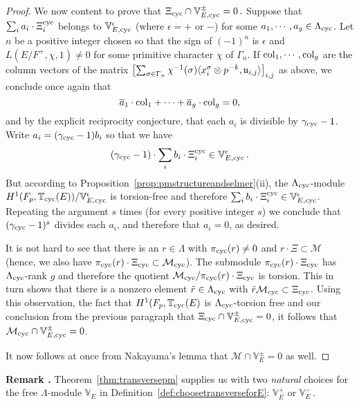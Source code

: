 \documentclass[12pt]{amsart}
\numberwithin{equation}{section}
\newenvironment{rem}{\par\medskip\noindent\refstepcounter{thm}
\bgroup{\hspace*{-0.15 cm}\bf{Remark} \thethm.}\bgroup}{\egroup
\egroup\par\medskip} \parskip 2pt
\begin{document}
\begin{proof}
We now content to prove that $\Xi_{\textup{cyc}} \cap \mathbb{V}^\pm_{E,{\textup{cyc}}}=0\,. $ Suppose that $\sum_i a_i\cdot \Xi_i^{\textup{cyc}}$ belongs to $\mathbb{V}^\epsilon_{E,{\textup{cyc}}}$ (where $\epsilon=+$ or $-$) for some $a_1,\cdots,a_g \in {\Lambda}_{\textup{cyc}}$. Let $n$ be a positive integer chosen so that the sign of $(-1)^n$ is $\epsilon$ and $L(E/F^+,\chi,1)\neq 0$ for some primitive character $\chi$ of $\Gamma_n$. If $\textup{col}_1,\cdots,\textup{col}_g$ are the column vectors of the matrix $\left[\sum_{\sigma\in \Gamma_n}\chi^{-1}(\sigma)\langle x_i^\sigma\otimes p^{-k},\frak{u}_{i,j}\rangle\right]_{i,j}$ as above, we conclude once again that 
$$\overline{a}_1\cdot\textup{col}_1+\cdots + \overline{a}_g\cdot\textup{col}_g=0,$$
and by the explicit reciprocity conjecture, that each $a_i$ is divisible by $\gamma_{\textup{cyc}}-1$. Write $a_i=(\gamma_{\textup{cyc}}-1)b_i$ so that we have 
$$(\gamma_{\textup{cyc}}-1)\cdot\sum_{i} b_i\cdot\Xi_i^{\textup{cyc}} \in \mathbb{V}^\epsilon_{E,{\textup{cyc}}}\,.$$ But according to Proposition~\ref{prop:pmstructureandselmer}(ii), the ${\Lambda}_{\textup{cyc}}$-module $ H^1(F_p,{\mathbb{T}}_{\textup{cyc}}(E))/\mathbb{V}^\epsilon_{E,{\textup{cyc}}}$ is torsion-free and therefore $\sum_{i} b_i\cdot\Xi_i^{\textup{cyc}} \in \mathbb{V}^\epsilon_{E,{\textup{cyc}}}$. Repeating the argument $s$ times (for every positive integer $s$) we conclude that $(\gamma_{\textup{cyc}}-1)^s$ divides each $a_i$, and therefore that $a_i=0$, as desired.

It is not hard to see that there is an $r \in {\Lambda}$ with $\pi_{\textup{cyc}}(r)\neq0$ and $r\cdot\Xi\subset \mathcal{M}$ (hence, we also have $\pi_{\textup{cyc}}(r)\cdot\Xi_{\textup{cyc}}\subset \mathcal{M}_{\textup{cyc}}$). 
The submodule $\pi_{\textup{cyc}}(r)\cdot\Xi_{\textup{cyc}}$ has ${\Lambda}_{\textup{cyc}}$-rank $g$ and therefore the quotient $\mathcal{M}_{\textup{cyc}}/\pi_{\textup{cyc}}(r)\cdot\Xi_{\textup{cyc}}$ is torsion. This in turn shows that there is a nonzero element $\tilde{r}\in {\Lambda}_{\textup{cyc}}$ with $\tilde{r}\mathcal{M}_{\textup{cyc}}\subset \Xi_{\textup{cyc}}$. Using this observation, the fact that $ H^1(F_p,{\mathbb{T}}_{\textup{cyc}}(E)$ is ${\Lambda}_{\textup{cyc}}$-torsion free and our conclusion from the previous paragraph that $\Xi_{\textup{cyc}} \cap \mathbb{V}^\pm_{E,{\textup{cyc}}}=0$, it follows that $\mathcal{M}_{\textup{cyc}} \cap\mathbb{V}^\pm_{E,{\textup{cyc}}}=0 $.

 It now follows at once from Nakayama's lemma that $\mathcal{M} \cap\mathbb{V}^\pm_E=0 $ as well.
\end{proof}
\begin{rem}
\label{rem:localconditionsnatural}
Theorem~\ref{thm:transversepm} supplies us with two \emph{natural} choices for the free ${\Lambda}$-module $\mathbb{V}_E$ in Definition~\ref{def:choosetransverseforE}: $\mathbb{V}_E^+$ or $\mathbb{V}_E^-$\,.
\end{rem}
\end{document}
